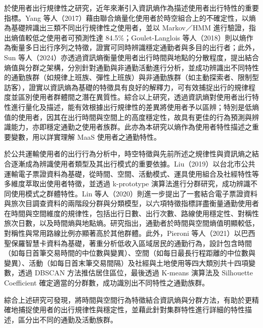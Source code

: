 於使用者出行規律性之研究，近年來漸引入資訊熵作為描述使用者出行特性的重要指標。Yang
等人（2017）藉由聯合熵量化使用者於時空組合上的不確定性，以熵為基礎辨識出三類不同出行規律性之使用者，並以
Markov／HMM 進行驗證，指出熵值較低之使用者可預測性達
84.5\%；Goulet-Langlois
等人（2018）則以熵作為衡量多日出行序列之特徵，證實可同時辨識穩定通勤者與多目的出行者；此外，Sun
等人（2024）亦透過資訊熵衡量使用者出行時間與地點的分散程度，提出結合熵值與分群之架構，分別針對通勤與非通勤活動進行分析，並成功辨識出不同特性的通勤族群（如規律上班族、彈性上班族）與非通勤族群（如主動探索者、限制型訪客），證實以資訊熵為基礎的特徵具有良好的解釋力，可有效捕捉出行的規律程度並區別使用者群體間之潛在異質性。綜合以上研究，透過資訊熵對使用者出行特性進行量化及描述，能有效根據出行規律性的差異將使用者予以區辨；特別是低熵值的使用者，因其在出行時間與空間上的高度穩定性，故具有更佳的行為預測與辨識能力，亦即穩定通勤之使用者族群。此亦為本研究以熵作為使用者特性描述之重要變數，用以詳實理解
MaaS 使用者之通勤特性。

於公共運輸使用者的出行行為分析中，時空特徵與先前所述之規律性與資訊熵之結合逐漸成為辨識使用者類型及其出行模式的重要依據。Liu（2019）以台北市公共運輸電子票證資料為基礎，從時間、空間、活動模式、運具使用組合及社經特性等多維度萃取出使用者特徵，並透過
k-prototype 演算法進行分群研究，成功辨識不同使用模式之群體特性。Lin
等人（2020）則進一步提出了一套結合電子票證資料與旅次目調查資料的兩階段分群與分類模型，以六項特徵指標詳盡衡量通勤使用者在時間與空間維度的規律性，包括出行日數、出行次數、路線使用穩定性、對稱性旅次日數，以及時間熵與地點熵。研究指出，通勤者於時間與空間熵值明顯較低，對稱性與常用路線比例亦顯著高於其他群體。此外，Pieroni
等人（2021）以巴西聖保羅智慧卡資料為基礎，著重分析低收入區域居民的通勤行為，設計包含時間（如每日首筆交易時間的中位數與變異）、空間（如每日最長行程距離的中位數與變異）、活動（如每日首末筆交易間隔）及社經與土地使用等四大類別共十四項變數，透過
DBSCAN 方法推估居住區位，最後透過 K-means 演算法及 Silhouette
Coefficient 確定適當的分群數，成功識別出不同特性之通勤族群。

綜合上述研究可發現，將時間與空間行為特徵結合資訊熵與分群方法，有助於更精確地捕捉使用者的出行規律性與穩定性，並藉此針對集群特性進行詳細的特性描述，區分出不同的通勤及活動族群。

